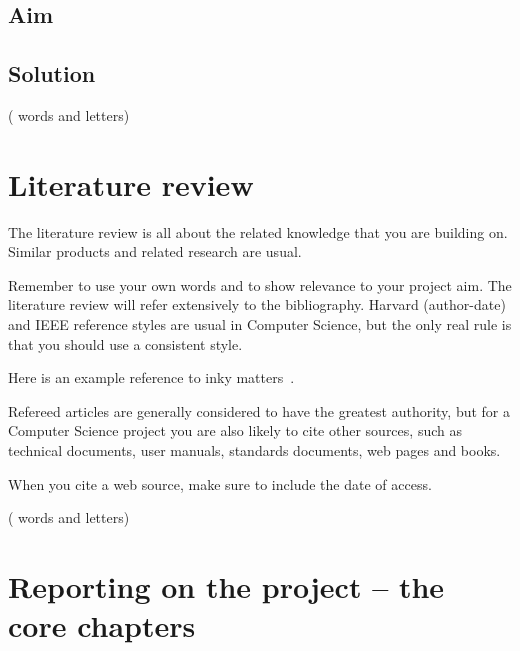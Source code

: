 \documentclass{main}
\newcounter{wordcount}
\newcounter{lettercount}
\begin{document}

\section{Aim}


\section{Solution}


\endcountem
(\thewordcount{} words and \thelettercount{} letters)

\chapter{Literature review}

\countem

The literature review is all about the related knowledge that you are building on.  Similar products and related research are usual.

Remember to use your own words and to show relevance to your project aim.
The literature review will refer extensively to the bibliography.  Harvard (author-date) and IEEE reference styles are usual in Computer Science, but the only real rule is that you should use a consistent style.

Here is an example reference to inky matters~\cite{Jones2010}.

Refereed articles are generally considered to have the greatest authority, but for a Computer Science project you are also likely to cite other sources, such as technical documents, user manuals, standards documents, web pages and books.

When you cite a web source, make sure to include the date of access.

\endcountem
(\thewordcount{} words and \thelettercount{} letters)

\chapter{Reporting on the project -- the core chapters}
\end{document}
